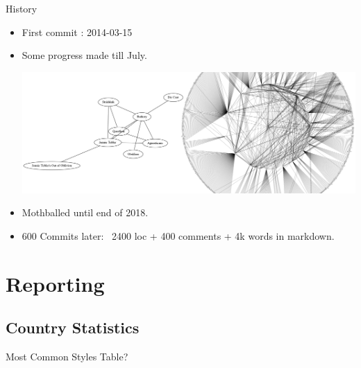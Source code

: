 \documentclass{beamer}
\begin{document}
    \begin{frame}{History}

      \begin{itemize}

        \item<1-> First commit : 2014-03-15
        \item<1-> Some progress made till July.
          \begin{center}
            \includegraphics[scale=.6]{bandsGraphCombined}
          \end{center}
        \item<2-> Mothballed until end of 2018.
        \item<2-> 600 Commits later: ~2400 loc + 400 comments + 4k words in
          markdown.
      \end{itemize}

    \end{frame}



\section{Reporting}

  \subsection{Country Statistics}

    \begin{frame}{Most Common Styles}
      Table?
    \end{frame}
\end{document}
